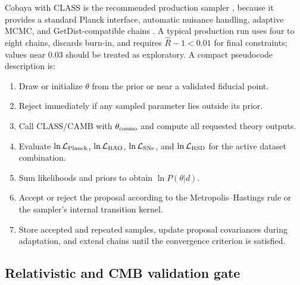 \documentclass[pdflatex,sn-mathphys-num]{sn-jnl}%
\begin{document}
Cobaya with CLASS is the recommended production sampler \cite{Torrado:2020dgo,Blas:2011rf}, because it provides a
standard Planck interface, automatic nuisance handling, adaptive MCMC, and
GetDist-compatible chains \cite{Lewis:2019xzd}. A typical production run uses four to eight chains,
discards burn-in, and requires $\hat R-1<0.01$ for final constraints; values
near $0.03$ should be treated as exploratory. A compact pseudocode description
is:
\begin{enumerate}
    \item Draw or initialize $\theta$ from the prior or near a validated fiducial point.
    \item Reject immediately if any sampled parameter lies outside its prior.
    \item Call CLASS/CAMB with $\theta_{\rm cosmo}$ and compute all requested theory outputs.
    \item Evaluate $\ln {\cal L}_{\rm Planck}$, $\ln {\cal L}_{\rm BAO}$, $\ln {\cal L}_{\rm SNe}$, and $\ln {\cal L}_{\rm RSD}$ for the active dataset combination.
    \item Sum likelihoods and priors to obtain $\ln P(\theta|d)$.
    \item Accept or reject the proposal according to the Metropolis--Hastings rule or the sampler's internal transition kernel.
    \item Store accepted and repeated samples, update proposal covariances during adaptation, and extend chains until the convergence criterion is satisfied.
\end{enumerate}

\subsection{Relativistic and CMB validation gate}
\label{subsec:pipeline_validation_gate}
\end{document}
